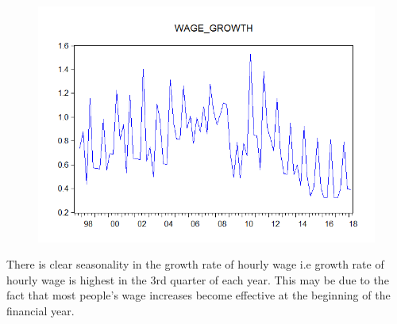 \documentclass[12pt]{report}
\begin{document}
\vspace{-\baselineskip}
\begin{figure}[H]
	\centerline{\includegraphics{wagegrowthline}}
\end{figure}
\vspace{-\baselineskip} \noindent There is clear seasonality in the growth rate of hourly wage i.e growth rate of hourly wage is highest in the 3rd quarter of each year. This may be due to the fact that most people's wage increases become effective at the beginning of the financial year.
\end{document}
